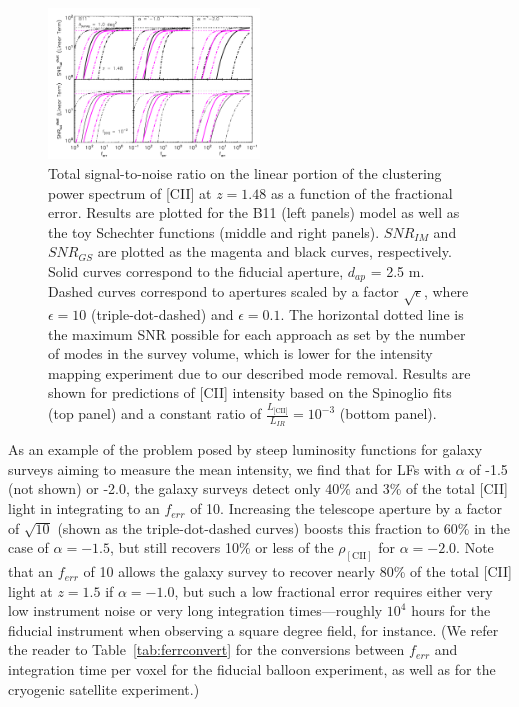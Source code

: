 \documentclass[iop]{emulateapj}
\begin{document}
\begin{figure}[h]
 \centering
 \includegraphics[width=0.5\textwidth]{snr_im_gs_ferr_nmodeIM_1d-1_1d3_b11_alpham1p0_alpham2p0_0p1vpix_vpix_10vpix_z148}
\caption{Total signal-to-noise ratio on the linear portion of the clustering power spectrum of [CII] at $z=1.48$ as a function of the fractional error. Results are plotted for the B11 (left panels) model as well as the toy Schechter functions (middle and right panels). $SNR_{IM}$ and $SNR_{GS}$ are plotted as the magenta and black curves, respectively. Solid curves correspond to the fiducial aperture, $d_{ap}$ = 2.5 m. Dashed curves correspond to apertures scaled by a factor $\sqrt{\epsilon}$, where $\epsilon=10$ (triple-dot-dashed) and $\epsilon=0.1$. The horizontal dotted line is the maximum SNR possible for each approach as set by the number of modes in the survey volume, which is lower for the intensity mapping experiment due to our described mode removal. Results are shown for predictions of [CII] intensity based on the Spinoglio fits (top panel) and a constant ratio of $\frac{L_{\textrm{[CII]}}}{L_{IR}} = 10^{-3}$ (bottom panel).}
\label{fig:snr_vs_ferr}
\end{figure}

As an example of the problem posed by steep luminosity functions for galaxy surveys aiming to measure the mean intensity, we find that for LFs with $\alpha$ of -1.5 (not shown) or -2.0, the galaxy surveys detect only 40\% and 3\% of the total [CII] light in integrating to an $f_{err}$ of 10. Increasing the telescope aperture by a factor of $\sqrt{10}$ (shown as the triple-dot-dashed curves) boosts this fraction to 60\% in the case of $\alpha = -1.5$, but still recovers 10\% or less of the $\rho_{\mathrm{[CII]}}$ for $\alpha = -2.0$. Note that an $f_{err}$ of 10 allows the galaxy survey to recover nearly 80\% of the total [CII] light at $z=1.5$ if $\alpha=-1.0$, but such a low fractional error requires either very low instrument noise or very long integration times---roughly $10^4$ hours for the fiducial instrument when observing a square degree field, for instance. (We refer the reader to Table~\ref{tab:ferrconvert} for the conversions between $f_{err}$ and integration time per voxel for the fiducial balloon experiment, as well as for the cryogenic satellite experiment.)
 
\end{document}

